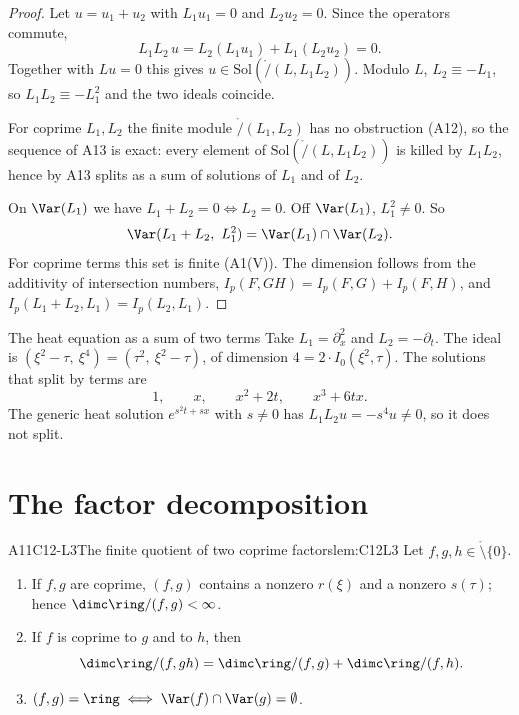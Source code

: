 \begin{proof}
Let $u=u_1+u_2$ with $L_1u_1=0$ and $L_2u_2=0$. Since the operators commute,
\[
L_1L_2\,u=L_2(L_1u_1)+L_1(L_2u_2)=0 .
\]
Together with $Lu=0$ this gives $u\in\mathrm{Sol}(\ring/(L,L_1L_2))$. Modulo $L$, $L_2\equiv-L_1$, so $L_1L_2\equiv-L_1^2$ and the two ideals coincide.

For coprime $L_1,L_2$ the finite module $\ring/(L_1,L_2)$ has no obstruction (A12), so the sequence of A13 is exact: every element of $\mathrm{Sol}(\ring/(L,L_1L_2))$ is killed by $L_1L_2$, hence by A13 splits as a sum of solutions of $L_1$ and of $L_2$.

On $\Var(L_1)$ we have $L_1+L_2=0\iff L_2=0$. Off $\Var(L_1)$, $L_1^2\ne0$. So
\[
\Var(L_1+L_2,\ L_1^2)=\Var(L_1)\cap\Var(L_2).
\]
For coprime terms this set is finite (A1(V)). The dimension follows from the additivity of intersection numbers, $I_p(F,GH)=I_p(F,G)+I_p(F,H)$, and $I_p(L_1+L_2,L_1)=I_p(L_2,L_1)$.

\end{proof}

\begin{example}{The heat equation as a sum of two terms}
Take $L_1=\partial_x^2$ and $L_2=-\partial_t$. The ideal is $(\xi^2-\tau,\ \xi^4)=(\tau^2,\ \xi^2-\tau)$, of dimension $4=2\cdot I_0(\xi^2,\tau)$. The solutions that split by terms are
\[
1,\qquad x,\qquad x^2+2t,\qquad x^3+6tx .
\]
The generic heat solution $e^{s^2t+sx}$ with $s\ne0$ has $L_1L_2u=-s^4u\ne0$, so it does not split.
\end{example}

\section{The factor decomposition}

\begin{dimcard}{A11}{C12-L3}{The finite quotient of two coprime factors}{\proved}{lem:C12L3}
Let $f,g,h\in\ring\setminus\{0\}$.
\begin{enumerate}[label=(\alph*)]
\item If $f,g$ are coprime, $(f,g)$ contains a nonzero $r(\xi)$ and a nonzero $s(\tau)$; hence $\dimc\ring/(f,g)<\infty$.
\item If $f$ is coprime to $g$ and to $h$, then
\[
\dimc\ring/(f,gh)=\dimc\ring/(f,g)+\dimc\ring/(f,h).
\]
\item $(f,g)=\ring\iff\Var(f)\cap\Var(g)=\emptyset$.
\end{enumerate}
\end{dimcard}

